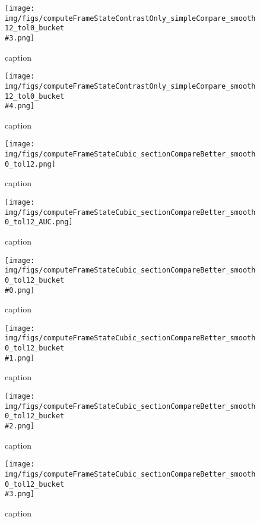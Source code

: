 %
\begin{figure}[!ht]
	\centering
	\texttt{[image: img/figs/computeFrameStateContrastOnly\_simpleCompare\_smooth12\_tol0\_bucket\\\#3.png]}
	\caption{caption}
	\label{fig:computeFrameStateContrastOnly_simpleCompare_smooth12_tol0_bucket\#3.png}
\end{figure}
%
\begin{figure}[!ht]
	\centering
	\texttt{[image: img/figs/computeFrameStateContrastOnly\_simpleCompare\_smooth12\_tol0\_bucket\\\#4.png]}
	\caption{caption}
	\label{fig:computeFrameStateContrastOnly_simpleCompare_smooth12_tol0_bucket\#4.png}
\end{figure}
%
\begin{figure}[!ht]
	\centering
	\texttt{[image: img/figs/computeFrameStateCubic\_sectionCompareBetter\_smooth0\_tol12.png]}
	\caption{caption}
	\label{fig:computeFrameStateCubic_sectionCompareBetter_smooth0_tol12.png}
\end{figure}
%
\begin{figure}[!ht]
	\centering
	\texttt{[image: img/figs/computeFrameStateCubic\_sectionCompareBetter\_smooth0\_tol12\_AUC.png]}
	\caption{caption}
	\label{fig:computeFrameStateCubic_sectionCompareBetter_smooth0_tol12_AUC.png}
\end{figure}
%
\begin{figure}[!ht]
	\centering
	\texttt{[image: img/figs/computeFrameStateCubic\_sectionCompareBetter\_smooth0\_tol12\_bucket\\\#0.png]}
	\caption{caption}
	\label{fig:computeFrameStateCubic_sectionCompareBetter_smooth0_tol12_bucket\#0.png}
\end{figure}
%
\begin{figure}[!ht]
	\centering
	\texttt{[image: img/figs/computeFrameStateCubic\_sectionCompareBetter\_smooth0\_tol12\_bucket\\\#1.png]}
	\caption{caption}
	\label{fig:computeFrameStateCubic_sectionCompareBetter_smooth0_tol12_bucket\#1.png}
\end{figure}
%
\begin{figure}[!ht]
	\centering
	\texttt{[image: img/figs/computeFrameStateCubic\_sectionCompareBetter\_smooth0\_tol12\_bucket\\\#2.png]}
	\caption{caption}
	\label{fig:computeFrameStateCubic_sectionCompareBetter_smooth0_tol12_bucket\#2.png}
\end{figure}
%
\begin{figure}[!ht]
	\centering
	\texttt{[image: img/figs/computeFrameStateCubic\_sectionCompareBetter\_smooth0\_tol12\_bucket\\\#3.png]}
	\caption{caption}
	\label{fig:computeFrameStateCubic_sectionCompareBetter_smooth0_tol12_bucket\#3.png}
\end{figure}
